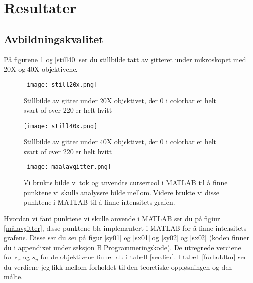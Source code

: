 \documentclass[norsk,a4paper,12pt]{article}
\begin{document}
\section{Resultater}
\subsection{Avbildningskvalitet}


På figurene \ref{still20} og \vref{still40} ser du stillbilde tatt av gitteret under mikroskopet med 20X og 40X objektivene.

\begin{figure}
	\begin{center}
  	\texttt{[image: still20x.png]}\\
	\caption[Stillbilde av gitter under 20X objektivet]{Stillbilde av gitter under 20X objektivet, der 0 i colorbar er helt svart of over 220 er helt hvitt}
	\label{still20}
	\end{center}
\end{figure}
\begin{figure}
	\begin{center}
  	\texttt{[image: still40x.png]}\\
	\caption[Stillbilde av gitter under 40X objektivet]{Stillbilde av gitter under 40X objektivet, der 0 i colorbar er helt svart of over 220 er helt hvitt}
	\label{still40}
	\end{center}
\end{figure}


\begin{figure}
	\begin{center}
  	\texttt{[image: maalavgitter.png]}\\
	\caption[Hvordan vi fant gitter avstand]{Vi brukte bilde vi tok og anvendte cursertool i MATLAB til å finne punktene vi skulle analysere bilde mellom. Videre brukte vi disse punktene i MATLAB til å finne intensitets grafen.}
	\label{målavgitter}
	\end{center}
\end{figure}

Hvordan vi fant punktene vi skulle anvende i MATLAB ser du på figiur \vref{målavgitter}, disse punktene ble implementert i MATLAB for å finne intensitets grafene. Disse ser du ser på figur \ref{sy01} og \vref{sx01} og  \ref{sy02} og \vref{sx02} (koden finner du i appendixet under seksjon B Programmeringskode).  De utregnede verdiene for $s_x$ og $s_y$ for de objektivene finner du i tabell \vref{verdier}. I tabell \vref{forholdtm} ser du verdiene jeg fikk mellom forholdet til den teoretiske oppløsningen og den målte.
\end{document}
